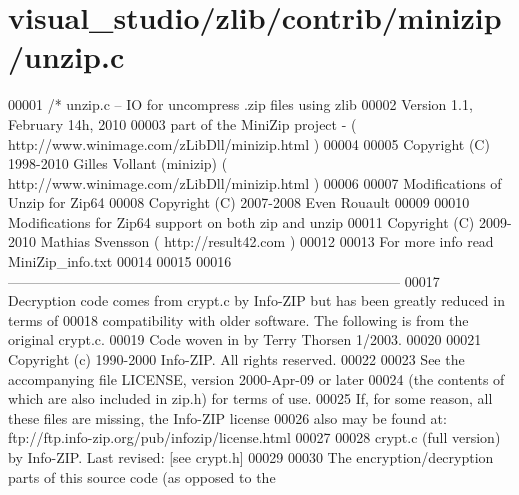 \hypertarget{visual__studio_2zlib_2contrib_2minizip_2unzip_8c_source}{}\section{visual\+\_\+studio/zlib/contrib/minizip/unzip.c}
\label{visual__studio_2zlib_2contrib_2minizip_2unzip_8c_source}

\begin{DoxyCode}
00001 \textcolor{comment}{/* unzip.c -- IO for uncompress .zip files using zlib}
00002 \textcolor{comment}{   Version 1.1, February 14h, 2010}
00003 \textcolor{comment}{   part of the MiniZip project - ( http://www.winimage.com/zLibDll/minizip.html )}
00004 \textcolor{comment}{}
00005 \textcolor{comment}{         Copyright (C) 1998-2010 Gilles Vollant (minizip) ( http://www.winimage.com/zLibDll/minizip.html )}
00006 \textcolor{comment}{}
00007 \textcolor{comment}{         Modifications of Unzip for Zip64}
00008 \textcolor{comment}{         Copyright (C) 2007-2008 Even Rouault}
00009 \textcolor{comment}{}
00010 \textcolor{comment}{         Modifications for Zip64 support on both zip and unzip}
00011 \textcolor{comment}{         Copyright (C) 2009-2010 Mathias Svensson ( http://result42.com )}
00012 \textcolor{comment}{}
00013 \textcolor{comment}{         For more info read MiniZip\_info.txt}
00014 \textcolor{comment}{}
00015 \textcolor{comment}{}
00016 \textcolor{comment}{  ------------------------------------------------------------------------------------}
00017 \textcolor{comment}{  Decryption code comes from crypt.c by Info-ZIP but has been greatly reduced in terms of}
00018 \textcolor{comment}{  compatibility with older software. The following is from the original crypt.c.}
00019 \textcolor{comment}{  Code woven in by Terry Thorsen 1/2003.}
00020 \textcolor{comment}{}
00021 \textcolor{comment}{  Copyright (c) 1990-2000 Info-ZIP.  All rights reserved.}
00022 \textcolor{comment}{}
00023 \textcolor{comment}{  See the accompanying file LICENSE, version 2000-Apr-09 or later}
00024 \textcolor{comment}{  (the contents of which are also included in zip.h) for terms of use.}
00025 \textcolor{comment}{  If, for some reason, all these files are missing, the Info-ZIP license}
00026 \textcolor{comment}{  also may be found at:  ftp://ftp.info-zip.org/pub/infozip/license.html}
00027 \textcolor{comment}{}
00028 \textcolor{comment}{        crypt.c (full version) by Info-ZIP.      Last revised:  [see crypt.h]}
00029 \textcolor{comment}{}
00030 \textcolor{comment}{  The encryption/decryption parts of this source code (as opposed to the}

\end{DoxyCode}
